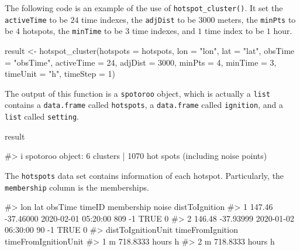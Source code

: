 The following code is an example of the use of
\texttt{hotspot\_cluster()}. It set the \texttt{activeTime} to be \(24\)
time indexes, the \texttt{adjDist} to be \(3000\) meters, the
\texttt{minPts} to be \(4\) hotspots, the \texttt{minTime} to be \(3\)
time indexes, and \(1\) time index to be \(1\) hour.

\begin{Schunk}
\begin{Sinput}
result <- hotspot_cluster(hotspots = hotspots,
                          lon = "lon",
                          lat = "lat",
                          obsTime = "obsTime",
                          activeTime = 24,
                          adjDist = 3000,
                          minPts = 4,
                          minTime = 3,
                          timeUnit = "h",
                          timeStep = 1)
\end{Sinput}
\end{Schunk}

The output of this function is a \texttt{spotoroo} object, which is
actually a \texttt{list} contains a \texttt{data.frame} called
\texttt{hotspots}, a \texttt{data.frame} called \texttt{ignition}, and a
\texttt{list} called \texttt{setting}.

\begin{Schunk}
\begin{Sinput}
result
\end{Sinput}
\begin{Soutput}
#> i spotoroo object: 6 clusters | 1070 hot spots (including noise points)
\end{Soutput}
\end{Schunk}

The \texttt{hotspots} data set contains information of each hotspot.
Particularly, the \texttt{membership} column is the memberships.

\begin{Schunk}
\begin{Soutput}
#>      lon       lat             obsTime timeID membership noise distToIgnition
#> 1 147.46 -37.46000 2020-02-01 05:20:00    809         -1  TRUE              0
#> 2 146.48 -37.93999 2020-01-02 06:30:00     90         -1  TRUE              0
#>   distToIgnitionUnit timeFromIgnition timeFromIgnitionUnit
#> 1                  m   718.8333 hours                    h
#> 2                  m   718.8333 hours                    h
\end{Soutput}
\end{Schunk}

